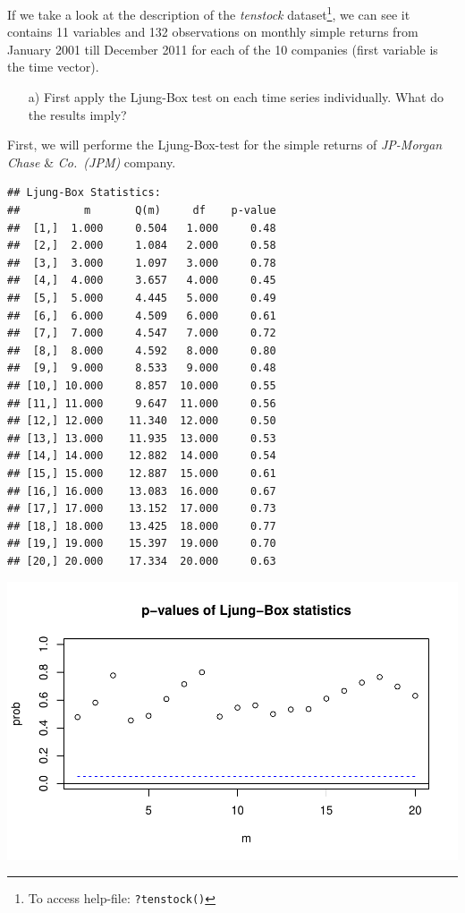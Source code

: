 \documentclass[12pt,a4paper]{article}
\newenvironment{Shaded}{\begin{snugshade}}{\end{snugshade}}
\newcommand{\DataTypeTok}[1]{\textcolor[rgb]{0.13,0.29,0.53}{#1}}
\newcommand{\DecValTok}[1]{\textcolor[rgb]{0.00,0.00,0.81}{#1}}
\newcommand{\KeywordTok}[1]{\textcolor[rgb]{0.13,0.29,0.53}{\textbf{#1}}}
\newcommand{\NormalTok}[1]{#1}
\newcommand{\OperatorTok}[1]{\textcolor[rgb]{0.81,0.36,0.00}{\textbf{#1}}}
\let\rmarkdownfootnote\footnote%
\def\footnote{\protect\rmarkdownfootnote}
\begin{document}
If we take a look at the description of the \emph{tenstock}
dataset\footnote{To access help-file: \texttt{?tenstock()}}, we can see
it contains 11 variables and 132 observations on monthly simple returns
from January 2001 till December 2011 for each of the 10 companies (first
variable is the time vector).

\begin{itemize}
  \item[a)] First apply the Ljung-Box test on each time series individually. What do the results imply?
\end {itemize}

First, we will performe the Ljung-Box-test for the simple returns of
\emph{JP-Morgan Chase} \& \emph{Co.~(JPM)} company.

\begin{Shaded}
\end{Shaded}

\begin{verbatim}
## Ljung-Box Statistics:  
##          m       Q(m)     df    p-value
##  [1,]  1.000     0.504   1.000     0.48
##  [2,]  2.000     1.084   2.000     0.58
##  [3,]  3.000     1.097   3.000     0.78
##  [4,]  4.000     3.657   4.000     0.45
##  [5,]  5.000     4.445   5.000     0.49
##  [6,]  6.000     4.509   6.000     0.61
##  [7,]  7.000     4.547   7.000     0.72
##  [8,]  8.000     4.592   8.000     0.80
##  [9,]  9.000     8.533   9.000     0.48
## [10,] 10.000     8.857  10.000     0.55
## [11,] 11.000     9.647  11.000     0.56
## [12,] 12.000    11.340  12.000     0.50
## [13,] 13.000    11.935  13.000     0.53
## [14,] 14.000    12.882  14.000     0.54
## [15,] 15.000    12.887  15.000     0.61
## [16,] 16.000    13.083  16.000     0.67
## [17,] 17.000    13.152  17.000     0.73
## [18,] 18.000    13.425  18.000     0.77
## [19,] 19.000    15.397  19.000     0.70
## [20,] 20.000    17.334  20.000     0.63
\end{verbatim}

\includegraphics{solution_exercise_1_files/figure-latex/unnamed-chunk-3-1.pdf}
\end{document}
